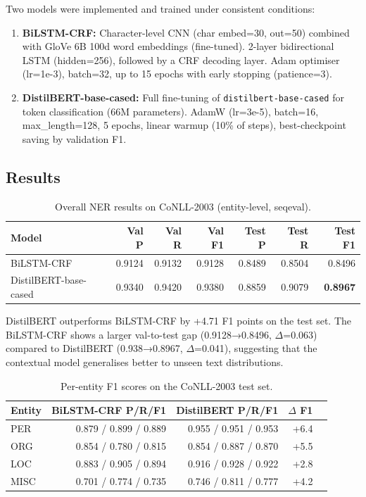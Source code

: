 \documentclass[11pt,a4paper]{article}
\begin{document}
Two models were implemented and trained under consistent conditions:

\begin{enumerate}
    \item \textbf{BiLSTM-CRF:} Character-level CNN (char embed=30, out=50) combined with GloVe 6B 100d word embeddings (fine-tuned). 2-layer bidirectional LSTM (hidden=256), followed by a CRF decoding layer. Adam optimiser (lr=1e-3), batch=32, up to 15 epochs with early stopping (patience=3).

    \item \textbf{DistilBERT-base-cased:} Full fine-tuning of \texttt{distilbert-base-cased} for token classification (66M parameters). AdamW (lr=3e-5), batch=16, max\_length=128, 5 epochs, linear warmup (10\% of steps), best-checkpoint saving by validation F1.
\end{enumerate}

\subsection{Results}

\begin{table}[H]
\centering
\caption{Overall NER results on CoNLL-2003 (entity-level, seqeval).}
\label{tab:q2results}
\begin{tabular}{lrrrrrr}
\toprule
Model & Val P & Val R & Val F1 & Test P & Test R & Test F1 \\
\midrule
BiLSTM-CRF            & 0.9124 & 0.9132 & 0.9128 & 0.8489 & 0.8504 & 0.8496 \\
DistilBERT-base-cased & 0.9340 & 0.9420 & 0.9380 & 0.8859 & 0.9079 & \textbf{0.8967} \\
\bottomrule
\end{tabular}
\end{table}

DistilBERT outperforms BiLSTM-CRF by +4.71 F1 points on the test set. The BiLSTM-CRF shows a larger val-to-test gap (0.9128→0.8496, $\Delta$=0.063) compared to DistilBERT (0.938→0.8967, $\Delta$=0.041), suggesting that the contextual model generalises better to unseen text distributions.

\begin{table}[H]
\centering
\caption{Per-entity F1 scores on the CoNLL-2003 test set.}
\label{tab:q2entity}
\begin{tabular}{lrrrr}
\toprule
Entity & BiLSTM-CRF P/R/F1 & DistilBERT P/R/F1 & $\Delta$ F1 \\
\midrule
PER  & 0.879 / 0.899 / 0.889 & 0.955 / 0.951 / 0.953 & +6.4 \\
ORG  & 0.854 / 0.780 / 0.815 & 0.854 / 0.887 / 0.870 & +5.5 \\
LOC  & 0.883 / 0.905 / 0.894 & 0.916 / 0.928 / 0.922 & +2.8 \\
MISC & 0.701 / 0.774 / 0.735 & 0.746 / 0.811 / 0.777 & +4.2 \\
\bottomrule
\end{tabular}
\end{table}
\end{document}
